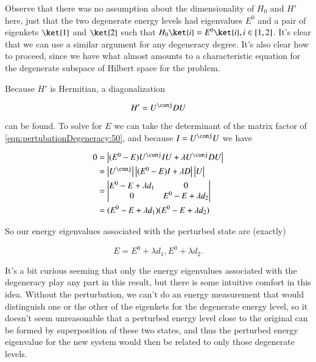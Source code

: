 Observe that there was no assumption about the dimensionality of $H_0$ and $H'$ here, just that the two degenerate energy levels had eigenvalues $E^0$ and a pair of eigenkets $\ket{1}$ and $\ket{2}$ such that $H_0 \ket{i} = E^0 \ket{i}, i \in [1,2]$.  It's clear that we can use a similar argument for any degeneracy degree.  It's also clear how to proceed, since we have what almost amounts to a characteristic equation for the degenerate subspace of Hilbert space for the problem.

Because $H'$ is Hermitian, a diagonalization

\begin{equation}\label{eqn:pertubationDegeneracy:70}
H' = U^\conj D U
\end{equation}

can be found.  To solve for $E$ we can take the determinant of the matrix factor of \ref{eqn:pertubationDegeneracy:50}, and because $I = U^\conj U$ we have

\begin{align*}
0 &=
\begin{vmatrix}
(E^0 -E) U^\conj I U + \lambda U^\conj D U 
\end{vmatrix} \\
&=
\begin{vmatrix}
U^\conj
\end{vmatrix}
\begin{vmatrix}
(E^0 -E)I + \lambda D 
\end{vmatrix}
\begin{vmatrix}
U
\end{vmatrix} \\
&=
\begin{vmatrix}
E^0 -E + \lambda d_1 & 0 \\
0 & E^0 -E + \lambda d_2
\end{vmatrix} \\
&=
(E^0 -E + \lambda d_1)(E^0 -E + \lambda d_2)
\end{align*}

So our energy eigenvalues associated with the perturbed state are (exactly) 

\begin{equation}\label{eqn:pertubationDegeneracy:90}
E = E^0 + \lambda d_1, E^0 + \lambda d_2.
\end{equation}

It's a bit curious seeming that only the energy eigenvalues associated with the degeneracy play any part in this result, but there is some intuitive comfort in this idea.  Without the perturbation, we can't do an energy measurement that would distinguish one or the other of the eigenkets for the degenerate energy level, so it doesn't seem unreasonable that a perturbed energy level close to the original can be formed by superposition of these two states, and thus the perturbed energy eigenvalue for the new system would then be related to only those degenerate levels.

